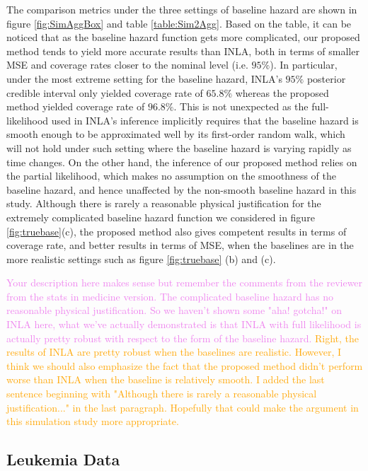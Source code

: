 \documentclass[ba]{imsart}
\newcommand{\alex}[1]{\textcolor{violet}{{ }#1}}
\newcommand{\ziang}[1]{\textcolor{orange}{{ }#1}}
\begin{document}
The comparison metrics under the three settings of baseline hazard are shown in figure \ref{fig:SimAggBox} and table \ref{table:Sim2Agg}. Based on the table, it can be noticed that as the baseline hazard function gets more complicated, our proposed method tends to yield more accurate results than INLA, both in terms of smaller MSE and coverage rates closer to the nominal level (i.e. $95\%$). In particular, under the most extreme setting for the baseline hazard, INLA's $95\%$ posterior credible interval only yielded coverage rate of $65.8\%$ whereas the proposed method yielded coverage rate of $96.8\%$. This is not unexpected as the full-likelihood used in INLA's inference implicitly requires that the baseline hazard is smooth enough to be approximated well by its first-order random walk, which will not hold under such setting where the baseline hazard is varying rapidly as time changes. On the other hand, the inference of our proposed method relies on the partial likelihood, which makes no assumption on the smoothness of the baseline hazard, and hence unaffected by the non-smooth baseline hazard in this study. Although there is rarely a reasonable physical justification for the extremely complicated baseline hazard function we considered in figure \ref{fig:truebase}(c), the proposed method also gives competent results in terms of coverage rate, and better results in terms of MSE, when the baselines are in the more realistic settings such as figure \ref{fig:truebase} (b) and (c).

\alex{Your description here makes sense but remember the comments from the reviewer from the stats in medicine version. The complicated baseline hazard has no reasonable physical justification. So we haven't shown some "aha! gotcha!" on INLA here, what we've actually demonstrated is that INLA with full likelihood is actually pretty robust with respect to the form of the baseline hazard.}
\ziang{Right, the results of INLA are pretty robust when the baselines are realistic. However, I think we should also emphasize the fact that the proposed method didn't perform worse than INLA when the baseline is relatively smooth. I added the last sentence beginning with "Although there is rarely a reasonable physical justification..." in the last paragraph. Hopefully that could make the argument in this simulation study more appropriate.}

\subsection{Leukemia Data}\label{subsec:leuk}
\end{document}
